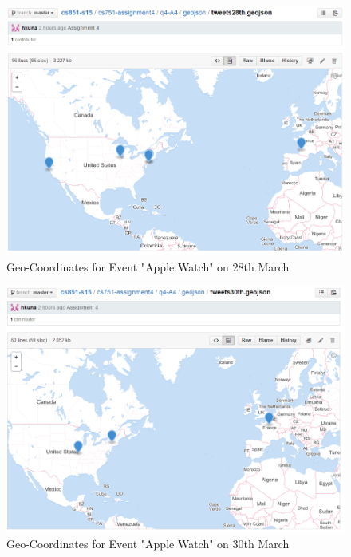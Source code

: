\documentclass[12pt]{Report}
\begin{document}
\begin{figure}[ht]    
    \begin{center}
        \includegraphics[scale=0.60]{geojson28th.png}
        \caption{Geo-Coordinates for Event "Apple Watch" on 28th March }
        \label{Geo-Coordinates for Event "Apple Watch" on 28th March}
    \end{center}
\end{figure}

\begin{figure}[ht]    
    \begin{center}
        \includegraphics[scale=0.60]{geojson30th.png}
        \caption{Geo-Coordinates for Event "Apple Watch" on 30th March }
        \label{Geo-Coordinates for Event "Apple Watch" on 30th March}
    \end{center}
\end{figure}
\end{document}

